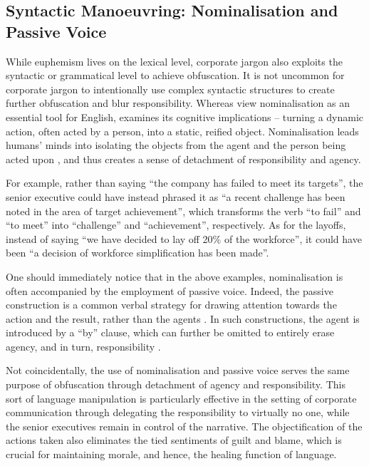 \documentclass[a4paper,12pt]{article}
\begin{document}
\subsection{Syntactic Manoeuvring: Nominalisation and Passive Voice}

While euphemism lives on the lexical level, corporate jargon also exploits the syntactic or grammatical level to achieve obfuscation.
It is not uncommon for corporate jargon to intentionally use complex syntactic structures to create further obfuscation and blur responsibility.
Whereas \textcite{Halliday2004} view nominalisation as an essential tool for English, \textcite{Bello2016} examines its cognitive implications -- turning a dynamic action, often acted by a person, into a static, reified object.
Nominalisation leads humans' minds into isolating the objects from the agent and the person being acted upon \parencite{Barsalou2010}, and thus creates a sense of detachment of responsibility and agency.

For example, rather than saying ``the company has failed to meet its targets'', the senior executive could have instead phrased it as ``a recent challenge has been noted in the area of target achievement'', which transforms the verb ``to fail'' and ``to meet'' into ``challenge'' and ``achievement'', respectively.
As for the layoffs, instead of saying ``we have decided to lay off 20\% of the workforce'', it could have been ``a decision of workforce simplification has been made''.

One should immediately notice that in the above examples, nominalisation is often accompanied by the employment of passive voice.
Indeed, the passive construction is a common verbal strategy for drawing attention towards the action and the result, rather than the agents \parencite{Memmedli2025}.
In such constructions, the agent is introduced by a ``by'' clause, which can further be omitted to entirely erase agency, and in turn, responsibility \parencite{Bailey1997}.

Not coincidentally, the use of nominalisation and passive voice serves the same purpose of obfuscation through detachment of agency and responsibility.
This sort of language manipulation is particularly effective in the setting of corporate communication through delegating the responsibility to virtually no one, while the senior executives remain in control of the narrative.
The objectification of the actions taken also eliminates the tied sentiments of guilt and blame, which is crucial for maintaining morale, and hence, the healing function of language.
\end{document}
